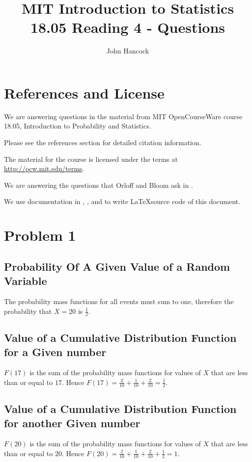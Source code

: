 \documentclass[a4paper,11pt]{article}
\author{John Hancock}
\title{MIT Introduction to Statistics 18.05 Reading 4 - Questions }
\begin{document}
\maketitle
\tableofcontents
\section{References and License}
We are answering questions in the material from MIT OpenCourseWare
course 18.05, Introduction to Probability and Statistics.

Please see the references section for detailed citation information.

The material for the course is licensed under the terms at 
\url{http://ocw.mit.edu/terms}.

We are answering the questions that Orloff and Bloom ask in
\cite{reading4Questions}.

We use documentation in \cite{latexSymbols}, \cite{limHowTo}, and
\cite{htmlLatexSymbols} to write \LaTeX source code of this
document.
 
\label{prob1}
\section{Problem 1}
\subsection{Probability Of A Given Value of a Random Variable}

The probability mass functions for all events must sum to one,
therefore the probability that $X=20$ is $\frac{1}{2}$.

\subsection{Value of a Cumulative Distribution Function for a Given
  number}

$ F \left( 17 \right)$ is the sum of the probability mass functions
for values of $X$ that are less than or equal to $17$.  Hence 
$ F \left( 17 \right) = \frac{2}{10} + \frac{1}{10} + \frac{2}{10} = 
\frac{1}{2}$.

\subsection{Value of a Cumulative Distribution Function for another
 Given number}

$ F \left( 20 \right)$ is the sum of the probability mass functions
for values of $X$ that are less than or equal to $20$.  Hence 
$ F \left( 20 \right) = \frac{2}{10} + \frac{1}{10} + \frac{2}{10}  
 + \frac{1}{2} = 1$.
\end{document}
